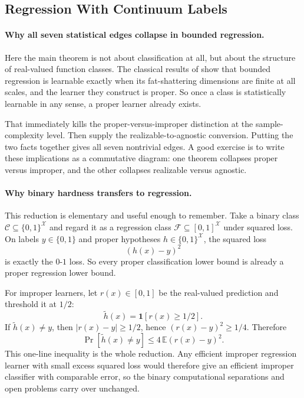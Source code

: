 \subsection{Regression With Continuum Labels}

\paragraph{Why all seven statistical edges collapse in bounded regression.}
Here the main theorem is not about classification at all, but about the structure of real-valued function classes. The classical results of \citet{bartlett1996, alon1997} show that bounded regression is learnable exactly when its fat-shattering dimensions are finite at all scales, and the learner they construct is proper. So once a class is statistically learnable in any sense, a proper learner already exists.

That immediately kills the proper-versus-improper distinction at the sample-complexity level. Then \citet{hopkins2024} supply the realizable-to-agnostic conversion. Putting the two facts together gives all seven nontrivial edges. A good exercise is to write these implications as a commutative diagram: one theorem collapses proper versus improper, and the other collapses realizable versus agnostic.

\paragraph{Why binary hardness transfers to regression.}
This reduction is elementary and useful enough to remember. Take a binary class $\mathcal{C} \subseteq \{0,1\}^{\mathcal{X}}$ and regard it as a regression class $\mathcal{F} \subseteq [0,1]^{\mathcal{X}}$ under squared loss. On labels $y \in \{0,1\}$ and proper hypotheses $h \in \{0,1\}^{\mathcal{X}}$, the squared loss
\[
(h(x)-y)^2
\]
is exactly the $0$-$1$ loss. So every proper classification lower bound is already a proper regression lower bound.

For improper learners, let $r(x) \in [0,1]$ be the real-valued prediction and threshold it at $1/2$:
\[
\tilde h(x) = \mathbf{1}[r(x) \ge 1/2].
\]
If $\tilde h(x) \neq y$, then $|r(x)-y| \ge 1/2$, hence $(r(x)-y)^2 \ge 1/4$. Therefore
\[
\Pr[\tilde h(x) \neq y] \le 4 \, \mathbb{E}(r(x)-y)^2.
\]
This one-line inequality is the whole reduction. Any efficient improper regression learner with small excess squared loss would therefore give an efficient improper classifier with comparable error, so the binary computational separations and open problems carry over unchanged.
